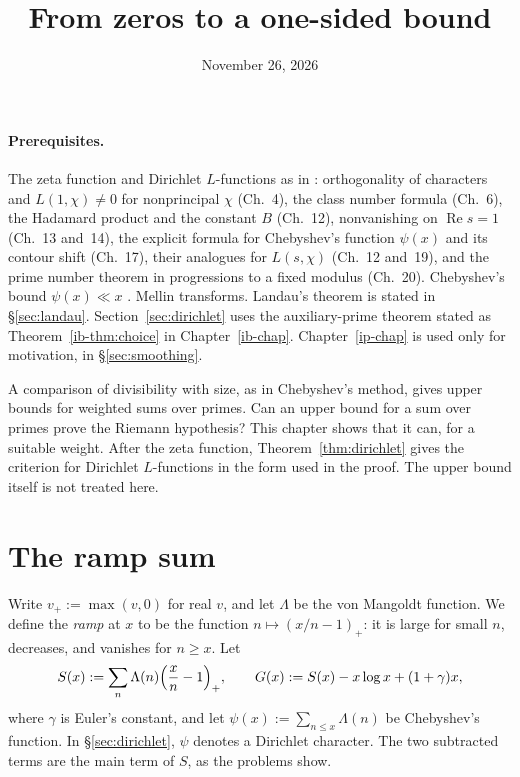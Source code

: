 \documentclass[reqno]{amsart}
\title{From zeros to a one-sided bound}
\author{}
\date{November 26, 2026}
\newcounter{chap}
\theoremstyle{definition}
\theoremstyle{plain}
\renewcommand{\Re}{\operatorname{Re}}
\begin{document}
\maketitle
{}\label{chap}


\paragraph{Prerequisites.}
The zeta function and Dirichlet $L$-functions as in \cite{Dav}: orthogonality of characters and $L(1, \chi) \ne 0$ for nonprincipal $\chi$ (Ch.~4), the class number formula (Ch.~6), the Hadamard product and the constant $B$ (Ch.~12), nonvanishing on $\Re s = 1$ (Ch.~13 and~14), the explicit formula for Chebyshev's function $\psi(x)$ and its contour shift (Ch.~17), their analogues for $L(s, \chi)$ (Ch.~12 and~19), and the prime number theorem in progressions to a fixed modulus (Ch.~20).  Chebyshev's bound $\psi(x) \ll x$ \cite[\S2.2]{MV}.  Mellin transforms.  Landau's theorem is stated in \S\ref{sec:landau}.  Section~\ref{sec:dirichlet} uses the auxiliary-prime theorem stated as Theorem~\ref{ib-thm:choice} in Chapter~\ref{ib-chap}.  Chapter~\ref{ip-chap} is used only for motivation, in \S\ref{sec:smoothing}. %

\medskip
A comparison of divisibility with size, as in Chebyshev's method, gives upper bounds for weighted sums over primes.  Can an upper bound for a sum over primes prove the Riemann hypothesis?  This chapter shows that it can, for a suitable weight.  After the zeta function, Theorem~\ref{thm:dirichlet} gives the criterion for Dirichlet $L$-functions in the form used in the proof.  The upper bound itself is not treated here.

\section{The ramp sum}\label{sec:ramp}

Write $v_+ := \max(v, 0)$ for real $v$, and let $\Lambda$ be the von Mangoldt function.  We define the \emph{ramp} at $x$ to be the function $n \mapsto (x/n - 1)_+$: it is large for small $n$, decreases, and vanishes for $n \ge x$.  Let
\begin{equation}\label{eq:G}
  S(x) := \sum_{n} \Lambda(n) \Bigl(\frac{x}{n} - 1\Bigr)_+ ,
  \qquad
  G(x) := S(x) - x \log x + (1 + \gamma) x ,
\end{equation}
where $\gamma$ is Euler's constant, and let $\psi(x) := \sum_{n \le x} \Lambda(n)$ be Chebyshev's function.  In \S\ref{sec:dirichlet}, $\psi$ denotes a Dirichlet character.  The two subtracted terms are the main term of $S$, as the problems show.
\end{document}
